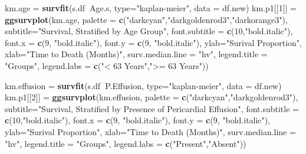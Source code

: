 \documentclass[
]{article}
\newenvironment{Shaded}{\begin{snugshade}}{\end{snugshade}}
\newcommand{\DataTypeTok}[1]{\textcolor[rgb]{0.13,0.29,0.53}{#1}}
\newcommand{\DecValTok}[1]{\textcolor[rgb]{0.00,0.00,0.81}{#1}}
\newcommand{\KeywordTok}[1]{\textcolor[rgb]{0.13,0.29,0.53}{\textbf{#1}}}
\newcommand{\NormalTok}[1]{#1}
\newcommand{\OperatorTok}[1]{\textcolor[rgb]{0.81,0.36,0.00}{\textbf{#1}}}
\newcommand{\StringTok}[1]{\textcolor[rgb]{0.31,0.60,0.02}{#1}}
\begin{document}
\begin{Shaded}
\begin{Highlighting}[]
{{\NormalTok{km.age =}\StringTok{ }\KeywordTok{survfit}\NormalTok{(s.df}\OperatorTok{~}\NormalTok{Age.s, }\DataTypeTok{type=}\StringTok{"kaplan-meier"}\NormalTok{, }\DataTypeTok{data =}\NormalTok{ df.new)}
\NormalTok{km.p1[[}\DecValTok{1}\NormalTok{]] =}\StringTok{ }\KeywordTok{ggsurvplot}\NormalTok{(km.age, }
                           \DataTypeTok{palette =} \KeywordTok{c}\NormalTok{(}\StringTok{"darkcyan"}\NormalTok{,}\StringTok{"darkgoldenrod3"}\NormalTok{,}\StringTok{"darkorange3"}\NormalTok{), }
                           \DataTypeTok{subtitle=}\StringTok{"Survival, Stratified by Age Group"}\NormalTok{,}
                           \DataTypeTok{font.subtitle =} \KeywordTok{c}\NormalTok{(}\DecValTok{10}\NormalTok{,}\StringTok{"bold.italic"}\NormalTok{),}
                           \DataTypeTok{font.x =} \KeywordTok{c}\NormalTok{(}\DecValTok{9}\NormalTok{, }\StringTok{"bold.italic"}\NormalTok{),}
                           \DataTypeTok{font.y =} \KeywordTok{c}\NormalTok{(}\DecValTok{9}\NormalTok{, }\StringTok{"bold.italic"}\NormalTok{),}
                           \DataTypeTok{ylab=}\StringTok{"Surival Proportion"}\NormalTok{, }
                           \DataTypeTok{xlab=}\StringTok{"Time to Death (Months)"}\NormalTok{,}
                           \DataTypeTok{surv.median.line =} \StringTok{"hv"}\NormalTok{,}
                           \DataTypeTok{legend.title =} \StringTok{"Groups"}\NormalTok{,}
                           \DataTypeTok{legend.labs =} \KeywordTok{c}\NormalTok{(}\StringTok{"< 63 Years"}\NormalTok{,}\StringTok{">= 63 Years"}\NormalTok{))}

\NormalTok{km.effusion =}\StringTok{ }\KeywordTok{survfit}\NormalTok{(s.df}\OperatorTok{~}\NormalTok{P.Effusion, }\DataTypeTok{type=}\StringTok{"kaplan-meier"}\NormalTok{, }\DataTypeTok{data =}\NormalTok{ df.new)}
\NormalTok{km.p1[[}\DecValTok{2}\NormalTok{]] =}\StringTok{ }\KeywordTok{ggsurvplot}\NormalTok{(km.effusion, }
                           \DataTypeTok{palette =} \KeywordTok{c}\NormalTok{(}\StringTok{"darkcyan"}\NormalTok{,}\StringTok{"darkgoldenrod3"}\NormalTok{), }
                           \DataTypeTok{subtitle=}\StringTok{"Survival, Stratified by Presence of Pericardial Effusion"}\NormalTok{,}
                           \DataTypeTok{font.subtitle =} \KeywordTok{c}\NormalTok{(}\DecValTok{10}\NormalTok{,}\StringTok{"bold.italic"}\NormalTok{),}
                           \DataTypeTok{font.x =} \KeywordTok{c}\NormalTok{(}\DecValTok{9}\NormalTok{, }\StringTok{"bold.italic"}\NormalTok{),}
                           \DataTypeTok{font.y =} \KeywordTok{c}\NormalTok{(}\DecValTok{9}\NormalTok{, }\StringTok{"bold.italic"}\NormalTok{),}
                           \DataTypeTok{ylab=}\StringTok{"Surival Proportion"}\NormalTok{, }
                           \DataTypeTok{xlab=}\StringTok{"Time to Death (Months)"}\NormalTok{,}
                           \DataTypeTok{surv.median.line =} \StringTok{"hv"}\NormalTok{,}
                           \DataTypeTok{legend.title =} \StringTok{"Groups"}\NormalTok{,}
                           \DataTypeTok{legend.labs =} \KeywordTok{c}\NormalTok{(}\StringTok{"Present"}\NormalTok{,}\StringTok{"Absent"}\NormalTok{))}

}}
\end{Highlighting}
\end{Shaded}
\end{document}

